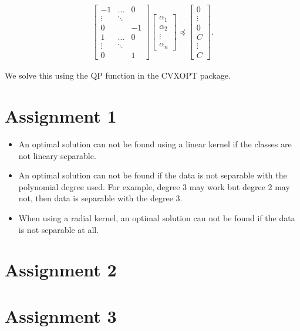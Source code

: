 \documentclass{article}
\begin{document}
\begin{align*}
\begin{bmatrix}
-1 & \hdots & 0 \\
\vdots & \ddots & \\
0  &  & -1 \\
1 & \hdots & 0 \\
\vdots & \ddots & \\
0  &  & 1
\end{bmatrix}
 \begin{bmatrix}
\alpha_1 \\
\alpha_2 \\
\vdots \\
\alpha_n 
\end{bmatrix}
\preccurlyeq
 \begin{bmatrix}
0 \\
\vdots \\
0 \\
C \\
\vdots \\
C
\end{bmatrix}.
\end{align*}


We solve this using the QP function in the CVXOPT package. 

\section*{Assignment 1}

\begin{itemize}
 \item An optimal solution can not be found using a linear kernel if the classes are not lineary separable.
 \item An optimal solution can not be found if the data is not separable with the polynomial degree used. 
 For example, degree 3 may work but degree 2 may not, then data is separable with the degree 3. 
 \item When using a radial kernel, an optimal solution can not be found if the data is not separable at all. 
\end{itemize}

\section*{Assignment 2}

\section*{Assignment 3}
\end{document}
